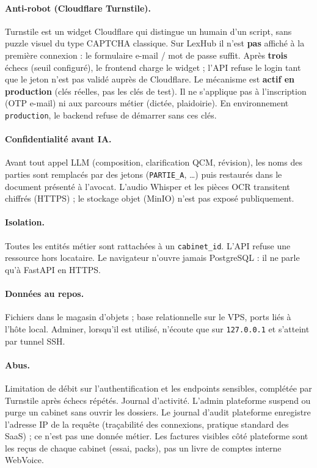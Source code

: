 \paragraph{Anti-robot (Cloudflare Turnstile).}
Turnstile est un widget Cloudflare qui distingue un humain d'un script, sans puzzle visuel du type CAPTCHA classique. Sur LexHub il n'est \textbf{pas} affiché à la première connexion : le formulaire e-mail / mot de passe suffit. Après \textbf{trois} échecs (seuil configuré), le frontend charge le widget ; l'API refuse le login tant que le jeton n'est pas validé auprès de Cloudflare. Le mécanisme est \textbf{actif en production} (clés réelles, pas les clés de test). Il ne s'applique pas à l'inscription (OTP e-mail) ni aux parcours métier (dictée, plaidoirie). En environnement \texttt{production}, le backend refuse de démarrer sans ces clés.

\paragraph{Confidentialité avant IA.}
Avant tout appel LLM (composition, clarification QCM, révision), les noms des parties sont remplacés par des jetons (\texttt{PARTIE\_A}, \ldots) puis restaurés dans le document présenté à l'avocat. L'audio Whisper et les pièces OCR transitent chiffrés (HTTPS) ; le stockage objet (MinIO) n'est pas exposé publiquement.

\paragraph{Isolation.}
Toutes les entités métier sont rattachées à un \texttt{cabinet\_id}. L'API refuse une ressource hors locataire. Le navigateur n'ouvre jamais PostgreSQL : il ne parle qu'à FastAPI en HTTPS.

\paragraph{Données au repos.}
Fichiers dans le magasin d'objets ; base relationnelle sur le VPS, ports liés à l'hôte local. Adminer, lorsqu'il est utilisé, n'écoute que sur \texttt{127.0.0.1} et s'atteint par tunnel SSH.

\paragraph{Abus.}
Limitation de débit sur l'authentification et les endpoints sensibles, complétée par Turnstile après échecs répétés. Journal d'activité. L'admin plateforme suspend ou purge un cabinet sans ouvrir les dossiers. Le journal d'audit plateforme enregistre l'adresse IP de la requête (traçabilité des connexions, pratique standard des SaaS) ; ce n'est pas une donnée métier. Les factures visibles côté plateforme sont les reçus de chaque cabinet (essai, packs), pas un livre de comptes interne WebVoice.

